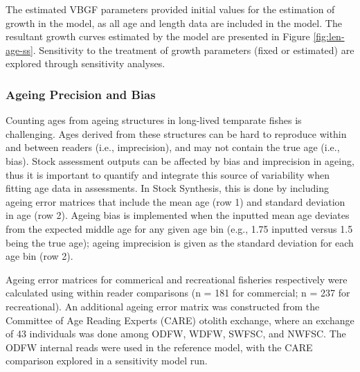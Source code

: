\documentclass[11pt,
  english,
  a4paper,
]{article}
\begin{document}
\vspace{0.5cm}


The estimated VBGF parameters provided initial values for the estimation of growth in the model, as all age and length data are included in the model. The resultant growth curves estimated by the model are presented in Figure \ref{fig:len-age-ss}. Sensitivity to the treatment of growth parameters (fixed or estimated) are explored through sensitivity analyses.

\leavevmode\tagmcend\tagstructend\par


\hypertarget{ageing-precision-and-bias}{%
\subsubsection{Ageing Precision and Bias}\label{ageing-precision-and-bias}}

\leavevmode\tagmcend\tagstructend


Counting ages from ageing structures in long-lived temparate fishes is challenging. Ages derived from these structures can be hard to reproduce within and between readers (i.e., imprecision), and may not contain the true age (i.e., bias). Stock assessment outputs can be affected by bias and imprecision in ageing, thus it is important to quantify and integrate this source of variability when fitting age data in assessments. In Stock Synthesis, this is done by including ageing error matrices that include the mean age (row 1) and standard deviation in age (row 2). Ageing bias is implemented when the inputted mean age deviates from the expected middle age for any given age bin (e.g., 1.75 inputted versus 1.5 being the true age); ageing imprecision is given as the standard deviation for each age bin (row 2).

\leavevmode\tagmcend\tagstructend\par


Ageing error matrices for commerical and recreational fisheries respectively were calculated using within reader comparisons (n = 181 for commercial; n = 237 for recreational). An additional ageing error matrix was constructed from the Committee of Age Reading Experts (CARE) otolith exchange, where an exchange of 43 individuals was done among ODFW, WDFW, SWFSC, and NWFSC. The ODFW internal reads were used in the reference model, with the CARE comparison explored in a sensitivity model run.
\end{document}
